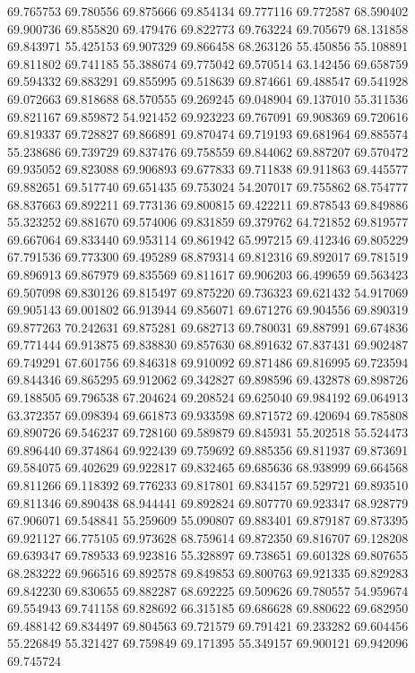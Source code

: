69.765753
69.780556
69.875666
69.854134
69.777116
69.772587
68.590402
69.900736
69.855820
69.479476
69.822773
69.763224
69.705679
68.131858
69.843971
55.425153
69.907329
69.866458
68.263126
55.450856
55.108891
69.811802
69.741185
55.388674
69.775042
69.570514
63.142456
69.658759
69.594332
69.883291
69.855995
69.518639
69.874661
69.488547
69.541928
69.072663
69.818688
68.570555
69.269245
69.048904
69.137010
55.311536
69.821167
69.859872
54.921452
69.923223
69.767091
69.908369
69.720616
69.819337
69.728827
69.866891
69.870474
69.719193
69.681964
69.885574
55.238686
69.739729
69.837476
69.758559
69.844062
69.887207
69.570472
69.935052
69.823088
69.906893
69.677833
69.711838
69.911863
69.445577
69.882651
69.517740
69.651435
69.753024
54.207017
69.755862
68.754777
68.837663
69.892211
69.773136
69.800815
69.422211
69.878543
69.849886
55.323252
69.881670
69.574006
69.831859
69.379762
64.721852
69.819577
69.667064
69.833440
69.953114
69.861942
65.997215
69.412346
69.805229
67.791536
69.773300
69.495289
68.879314
69.812316
69.892017
69.781519
69.896913
69.867979
69.835569
69.811617
69.906203
66.499659
69.563423
69.507098
69.830126
69.815497
69.875220
69.736323
69.621432
54.917069
69.905143
69.001802
66.913944
69.856071
69.671276
69.904556
69.890319
69.877263
70.242631
69.875281
69.682713
69.780031
69.887991
69.674836
69.771444
69.913875
69.838830
69.857630
68.891632
67.837431
69.902487
69.749291
67.601756
69.846318
69.910092
69.871486
69.816995
69.723594
69.844346
69.865295
69.912062
69.342827
69.898596
69.432878
69.898726
69.188505
69.796538
67.204624
69.208524
69.625040
69.984192
69.064913
63.372357
69.098394
69.661873
69.933598
69.871572
69.420694
69.785808
69.890726
69.546237
69.728160
69.589879
69.845931
55.202518
55.524473
69.896440
69.374864
69.922439
69.759692
69.885356
69.811937
69.873691
69.584075
69.402629
69.922817
69.832465
69.685636
68.938999
69.664568
69.811266
69.118392
69.776233
69.817801
69.834157
69.529721
69.893510
69.811346
69.890438
68.944441
69.892824
69.807770
69.923347
68.928779
67.906071
69.548841
55.259609
55.090807
69.883401
69.879187
69.873395
69.921127
66.775105
69.973628
68.759614
69.872350
69.816707
69.128208
69.639347
69.789533
69.923816
55.328897
69.738651
69.601328
69.807655
68.283222
69.966516
69.892578
69.849853
69.800763
69.921335
69.829283
69.842230
69.830655
69.882287
68.692225
69.509626
69.780557
54.959674
69.554943
69.741158
69.828692
66.315185
69.686628
69.880622
69.682950
69.488142
69.834497
69.804563
69.721579
69.791421
69.233282
69.604456
55.226849
55.321427
69.759849
69.171395
55.349157
69.900121
69.942096
69.745724
